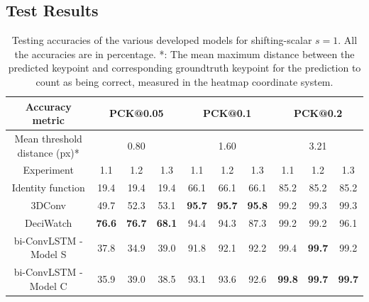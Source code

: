 \documentclass[./main.tex]{subfiles}
\begin{document}
\subsection{Test Results}
\label{subsec:finetune_test_res}
\begin{table}[htbp]
    \begin{tabular}{c||ccc|ccc|ccc}
        \hline
        Accuracy metric & \multicolumn{3}{c}{PCK@0.05} & \multicolumn{3}{c}{PCK@0.1} & \multicolumn{3}{c}{PCK@0.2} \\
        \hline
        Mean threshold distance (px)* & \multicolumn{3}{c}{0.80} & \multicolumn{3}{c}{1.60} & \multicolumn{3}{c}{3.21} \\
        \hline
        Experiment & 1.1 & 1.2 & 1.3 & 1.1 & 1.2 & 1.3 & 1.1 & 1.2 & 1.3 \\
        \hline
        \hline
        Identity function & 19.4 & 19.4 & 19.4 & 66.1 & 66.1 & 66.1 & 85.2 & 85.2 & 85.2 \\
        3DConv & 49.7 & 52.3 & 53.1 & \textbf{95.7} & \textbf{95.7} & \textbf{95.8} & 99.2 & 99.3 & 99.3 \\
        DeciWatch & \textbf{76.6} & \textbf{76.7} & \textbf{68.1} & 94.4 & 94.3 & 87.3 & 99.2 & 99.2 & 96.1 \\
        bi-ConvLSTM - Model S & 37.8 & 34.9 & 39.0 & 91.8 & 92.1 & 92.2 & 99.4 & \textbf{99.7} & 99.2 \\
        bi-ConvLSTM - Model C & 35.9 & 39.0 & 38.5 & 93.1 & 93.6 & 92.6 & \textbf{99.8} & \textbf{99.7} & \textbf{99.7} \\
        \hline
    \end{tabular}
    \caption{Testing accuracies of the various developed models for shifting-scalar $s = 1$. All the accuracies are in percentage. *: The mean maximum distance between the predicted keypoint and corresponding groundtruth keypoint for the prediction to count as being correct, measured in the heatmap coordinate system.}
    \label{tab:finetune_test_accs_1}
\end{table}
\end{document}
